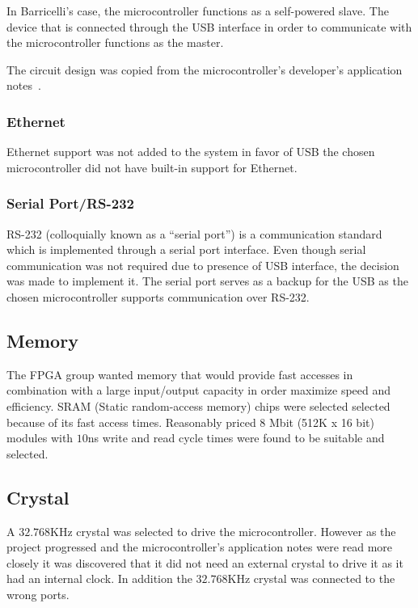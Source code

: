 In Barricelli's case, the microcontroller functions as a self-powered slave.
The device that is connected through the USB interface in order to communicate with the microcontroller functions as the master.

The circuit design was copied from the microcontroller's developer's application notes~\cite[Figure 2.2]{an0046}.


\subsubsection{Ethernet}
Ethernet support was not added to the system in favor of USB the chosen microcontroller did not have built-in support for Ethernet.


\subsubsection{Serial Port/RS-232} 
RS-232 (colloquially known as a ``serial port'') is a communication standard which is implemented through a serial port interface.
Even though serial communication was not required due to presence of USB interface, the decision was made to implement it.
The serial port serves as a backup for the USB as the chosen microcontroller supports communication over RS-232.

\subsection{Memory} \label{pcb:design-choices:ss:memory}
The FPGA group wanted memory that would provide fast accesses in combination with a large input/output capacity in order maximize speed and efficiency.
SRAM (Static random-access memory) chips were selected selected because of its fast access times.
Reasonably priced 8 Mbit (512K x 16 bit) modules with $10$ns write and read cycle times were found to be suitable and selected. 

\subsection{Crystal}
A $32.768$KHz crystal was selected to drive the microcontroller.
However as the project progressed and the microcontroller's application notes were read more closely it was discovered that it did not need an external crystal to drive it as it had an internal clock.
In addition the $32.768$KHz crystal was connected to the wrong ports. 
